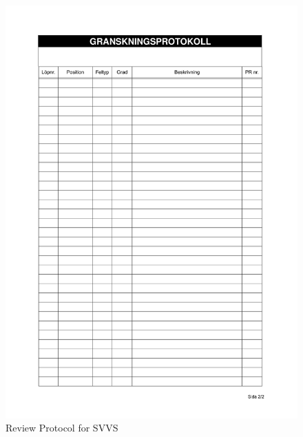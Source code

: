 \documentclass{article}
\begin{document}
 \begin{figure}
     \centering
     \includegraphics[width=13cm]{images/SVVS - Granskningsprotokoll-2}
     \renewcommand\figurename{Figure}
     \caption{Review Protocol for SVVS}
     \label{fig:my_label}
 \end{figure}
 
 
 


\end{document}
